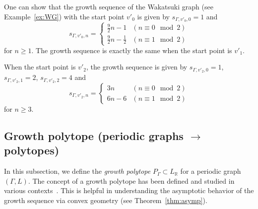\documentclass[ALCO,published]{cedram}
\theoremstyle{remark}
\begin{document}
\begin{ex}\label{ex:CS}
One can show that the growth sequence of the Wakatsuki graph (see Example~\ref{ex:WG}) with the start point $v'_0$ is given by 
$s_{\Gamma, v'_0, 0}=1$ and
\[
s_{\Gamma, v'_0, n} = \begin{cases}
\frac{9}{2}n - 1 & (n \equiv 0 \mod 2) \\
\frac{9}{2}n - \frac{1}{2} & (n \equiv 1 \mod 2) 
\end{cases} 
\]
for $n \ge 1$. 
The growth sequence is exactly the same when the start point is $v'_1$. 

When the start point is $v' _2$, the growth sequence is given by 
$s_{\Gamma, v'_2, 0}=1$, $s_{\Gamma, v'_2, 1}=2$, $s_{\Gamma, v'_2, 2}=4$ and
\[
s_{\Gamma, v'_2, n} = \begin{cases}
3n & (n \equiv 0 \mod 2) \\
6n - 6 & (n \equiv 1 \mod 2) 
\end{cases} 
\]
for $n \ge 3$. 
\end{ex}


\subsection{Growth polytope (periodic graphs \texorpdfstring{$\to$}{to} polytopes)} \label{subsection:GP}
In this subsection, we define the \textit{growth polytope} $P_{\Gamma} \subset L_{\mathbb{R}}$ for a periodic graph $(\Gamma, L)$. 
The concept of a growth polytope has been defined and studied in various contexts~\cite{KS02, KS06, Zhu02, Eon04, MS11, Fri13, ACIK}. 
This is helpful in understanding the asymptotic behavior of the growth sequence via convex geometry (see Theorem~\ref{thm:asymp}). 
\end{document}
